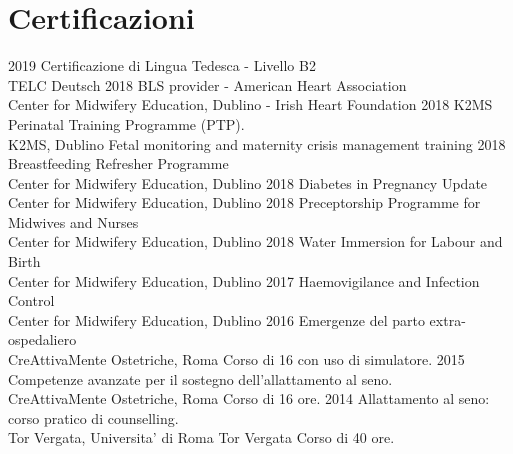 \documentclass[11pt]{friggeri-cv}
\begin{document}
\section{Certificazioni}
\begin{entrylist}
  \entry
    {2019}
    {Certificazione di Lingua Tedesca - Livello B2}
    {\\TELC Deutsch}
    {\vspace{-10pt}}
  \entry
    {2018}
    {BLS provider - American Heart Association}
    {\\Center for Midwifery Education, Dublino - Irish Heart Foundation}
    {\vspace{-10pt}}
  \entry
    {2018}
    {K2MS Perinatal Training Programme (PTP).}
    {\\K2MS, Dublino}
    {Fetal monitoring and maternity crisis management training}
  \entry
    {2018}
    {Breastfeeding Refresher Programme}
    {\\Center for Midwifery Education, Dublino}
    {\vspace{-10pt}}
  \entry
    {2018}
    {Diabetes in Pregnancy Update}
    {\\Center for Midwifery Education, Dublino}
    {\vspace{-10pt}}
  \entry
    {2018}
    {Preceptorship Programme for Midwives and Nurses}
    {\\Center for Midwifery Education, Dublino}
    {\vspace{-10pt}}
  \entry
    {2018}
    {Water Immersion for Labour and Birth}
    {\\Center for Midwifery Education, Dublino}
    {\vspace{-10pt}}
  \entry
    {2017}
    {Haemovigilance and Infection Control}
    {\\Center for Midwifery Education, Dublino}
    {\vspace{-10pt}}
  \entry
    {2016}
    {Emergenze del parto extra-ospedaliero}
    {\\CreAttivaMente Ostetriche, Roma}
    {Corso di 16 con uso di simulatore.}
  \entry
    {2015}
    {Competenze avanzate per il sostegno dell’allattamento al seno.}
    {\\CreAttivaMente Ostetriche, Roma }
    {Corso di 16 ore.}
  \entry
    {2014}
    {Allattamento al seno: corso pratico di counselling.}
    {\\Tor Vergata, Universita' di Roma Tor Vergata}
    {Corso di 40 ore.}
\end{entrylist}
\end{document}
